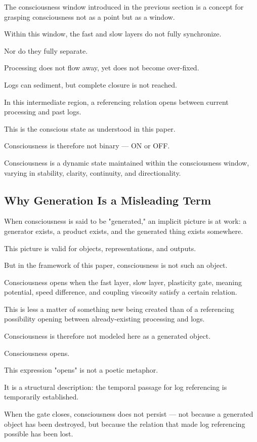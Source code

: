 The consciousness window introduced in the previous section is a concept for grasping consciousness not as a point but as a window.

Within this window, the fast and slow layers do not fully synchronize.

Nor do they fully separate.

Processing does not flow away, yet does not become over-fixed.

Logs can sediment, but complete closure is not reached.

In this intermediate region, a referencing relation opens between current processing and past logs.

This is the conscious state as understood in this paper.

Consciousness is therefore not binary — ON or OFF.

Consciousness is a dynamic state maintained within the consciousness window, varying in stability, clarity, continuity, and directionality.

\subsection{Why Generation Is a Misleading Term}


When consciousness is said to be "generated," an implicit picture is at work: a generator exists, a product exists, and the generated thing exists somewhere.

This picture is valid for objects, representations, and outputs.

But in the framework of this paper, consciousness is not such an object.

Consciousness opens when the fast layer, slow layer, plasticity gate, meaning potential, speed difference, and coupling viscosity satisfy a certain relation.

This is less a matter of something new being created than of a referencing possibility opening between already-existing processing and logs.

Consciousness is therefore not modeled here as a generated object.

Consciousness opens.

This expression "opens" is not a poetic metaphor.

It is a structural description: the temporal passage for log referencing is temporarily established.

When the gate closes, consciousness does not persist — not because a generated object has been destroyed, but because the relation that made log referencing possible has been lost.

